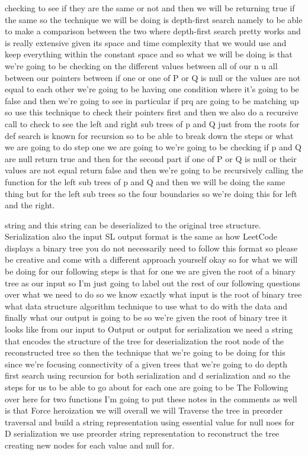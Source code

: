 \expandafter\def\csname sourceexcerpt@56\endcsname{%
checking to see if they are the same or not and then we will be returning true if the
same so the technique we will be doing is depth-first search namely to be able to make a
comparison between the two where depth-first search pretty works and is really extensive
given its space and time complexity that we would use and keep everything within the
constant space and so what we will be doing is that we're going to be checking on the
different values between all of our n u all between our pointers between if one or one
of P or Q is null or the values are not equal to each other we're going to be having
one condition where it's going to be false and then we're going to see in particular
if prq are going to be matching up so use this technique to check their pointers first
and then we also do a recursive call to check to see the left and right sub trees of p
and Q just from the roots for def search is known for recursion so to be able to break
down the steps or what we are going to do step one we are going to we're going to be
checking if p and Q are null return true and then for the second part if one of P or Q
is null or their values are not equal return false and then we're going to be
recursively calling the function for the left sub trees of p and Q and then we will be
doing the same thing but for the left sub trees so the four boundaries so we're doing this for
left and the right.
}

\expandafter\def\csname sourceexcerpt@57\endcsname{%
string and this string can be deserialized to the original tree structure. Serialization also
the input SL output format is the same as how LeetCode displays a binary tree you do not
necessarily need to follow this format so please be creative and come with a different
approach yourself okay so for what we will be doing for our following steps is that
for one we are given the root of a binary tree as our input so I'm just going to label
out the rest of our following questions over what we need to do so we know exactly
what input is the root of binary tree what data structure algorithm technique to use
what to do with the data and finally what our output is going to be so we're given the
root of binary tree it looks like from our input to Output or output for serialization
we need a string that encodes the structure of the tree for deserialization the root
node of the reconstructed tree so then the technique that we're going to be doing for
this since we're focusing connectivity of a given trees that we're going to do depth
first search using recursion for both serialization and d serialization and so the
steps for us to be able to go about for each one are going to be The Following over
here for two functions I'm going to put these notes in the comments as well is that
Force heroization we will overall we will Traverse the tree in preorder traversal and
build a string representation using essential value for null noes for D serialization
we use preorder string representation to reconstruct the tree creating new nodes for
each value and null for.
}

